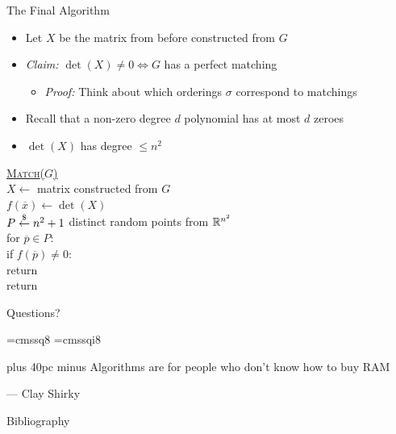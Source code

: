 \documentclass[aspectratio=169]{beamer}
\begin{document}
\begin{frame}{The Final Algorithm}
    \begin{itemize}
        \item Let $X$ be the matrix from before constructed from $G$
        \item \emph{Claim:} $\det(X) \neq 0 \iff G$ has a perfect matching \pause
        \begin{itemize}
            \item \emph{Proof:} Think about which orderings $\sigma$ correspond to matchings
        \end{itemize}
        \item Recall that a non-zero degree $d$ polynomial has at most $d$ zeroes
        \item $\det(X)$ has degree $\leq n^2$
    \end{itemize} \pause
    \begin{nalgo}
        \underline{\textsc{Match}($G$)}\+
    \\      $X \gets$ matrix constructed from $G$
    \\      $f(\overline{x}) \gets \det(X)$ 
    \\      $P \overset{\$}{\leftarrow} n^2 + 1$ distinct random points from $\mathbb{R}^{n^2}$
    \\      for $\overline{p} \in P$:\+
    \\          if $f(\overline{p}) \neq 0$:\+
    \\              return \true\-\-
    \\      return \false
    \end{nalgo}
\end{frame}

\begin{frame}{}
      \begin{center}
    {\color{sigma@mainblue} \LARGE Questions?}
  \end{center}
\end{frame}

\font\eightss=cmssq8
\font\eightssi=cmssqi8
\newcommand\quoteAuthorDate[2]{\begingroup
  \baselineskip 10pt
  \parfillskip 0pt
  \interlinepenalty 10000 %
  \leftskip 0pt plus 40pc minus \parindent
  \let\rm=\eightss
  \let\sl=\eightssi
  \everypar{\sl}#1\par
  \nobreak\smallskip
  \noindent\rm--- #2\unskip\enspace\par
  \endgroup}
\begin{frame}
    \begin{center}
        \item \quoteAuthorDate{Algorithms are for people who don't know how to buy RAM}{Clay Shirky}{\color{sigma@mainblue}}
    \end{center}
\end{frame}

\begin{frame}[allowframebreaks]{Bibliography}
    \tiny
    
    
\end{frame}
\end{document}
